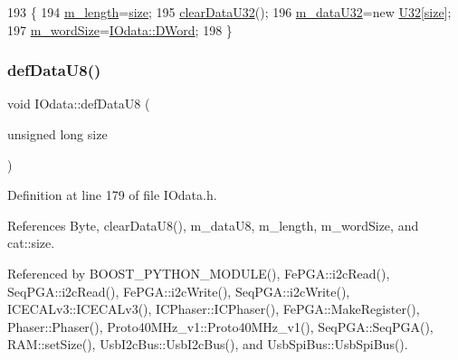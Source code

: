 \begin{DoxyCode}
193                                      \{
194     \hyperlink{classIOdata_afabe57441da019eb614d277799106aac}{m\_length}=\hyperlink{namespacecat_a3eae50bb86a614752045105e00365a46}{size};
195     \hyperlink{classIOdata_a848de1b6e7b7207dbb53c102a4d911a9}{clearDataU32}();
196     \hyperlink{classIOdata_a247cdaefd87084e3cad1d530d592d99a}{m\_dataU32}=\textcolor{keyword}{new} \hyperlink{ICECALv3_8h_a811024d35b9b8a41095b1f583b649e56}{U32}[\hyperlink{namespacecat_a3eae50bb86a614752045105e00365a46}{size}];
197     \hyperlink{classIOdata_a719b0ce607ada4fa91b12d6ecfa1b4c9}{m\_wordSize}=\hyperlink{classIOdata_a37c53ebf4bf8d866aac8af572962a84ca458da82d97e3ea9715c34b558c34f734}{IOdata::DWord};
198   \}
\end{DoxyCode}
\mbox{\label{classIOdata_a80bb230b61062b447db5832e43bf7b44}} 
\subsubsection{\texorpdfstring{def\+Data\+U8()}{defDataU8()}}
{\footnotesize\ttfamily void I\+Odata\+::def\+Data\+U8 (\begin{DoxyParamCaption}\item[{unsigned long}]{size }\end{DoxyParamCaption})\hspace{0.3cm}{\ttfamily [inline]}}



Definition at line 179 of file I\+Odata.\+h.



References Byte, clear\+Data\+U8(), m\+\_\+data\+U8, m\+\_\+length, m\+\_\+word\+Size, and cat\+::size.



Referenced by B\+O\+O\+S\+T\+\_\+\+P\+Y\+T\+H\+O\+N\+\_\+\+M\+O\+D\+U\+L\+E(), Fe\+P\+G\+A\+::i2c\+Read(), Seq\+P\+G\+A\+::i2c\+Read(), Fe\+P\+G\+A\+::i2c\+Write(), Seq\+P\+G\+A\+::i2c\+Write(), I\+C\+E\+C\+A\+Lv3\+::\+I\+C\+E\+C\+A\+Lv3(), I\+C\+Phaser\+::\+I\+C\+Phaser(), Fe\+P\+G\+A\+::\+Make\+Register(), Phaser\+::\+Phaser(), Proto40\+M\+Hz\+\_\+v1\+::\+Proto40\+M\+Hz\+\_\+v1(), Seq\+P\+G\+A\+::\+Seq\+P\+G\+A(), R\+A\+M\+::set\+Size(), Usb\+I2c\+Bus\+::\+Usb\+I2c\+Bus(), and Usb\+Spi\+Bus\+::\+Usb\+Spi\+Bus().


